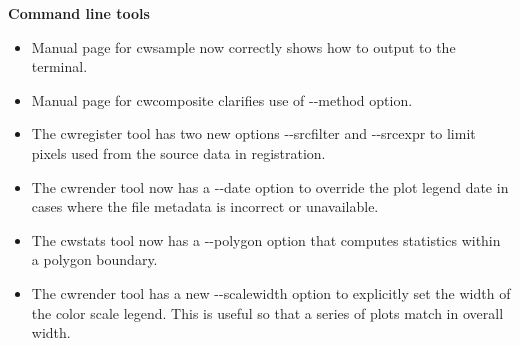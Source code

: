 \hspace{0.4cm} {\bf Command line tools}

\begin{itemize}

  \item Manual page for cwsample now correctly shows how to output to the
  terminal.

  \item Manual page for cwcomposite clarifies use of -{-}method option.

  \item The cwregister tool has two new options -{-}srcfilter and -{-}srcexpr
  to limit pixels used from the source data in registration.

  \item The cwrender tool now has a -{-}date option to override the plot legend
  date in cases where the file metadata is incorrect or unavailable.

  \item The cwstats tool now has a -{-}polygon option that computes statistics
  within a polygon boundary.

  \item The cwrender tool has a new -{-}scalewidth option to explicitly set the
  width of the color scale legend.  This is useful so that a series of plots
  match in overall width.

\end{itemize}

